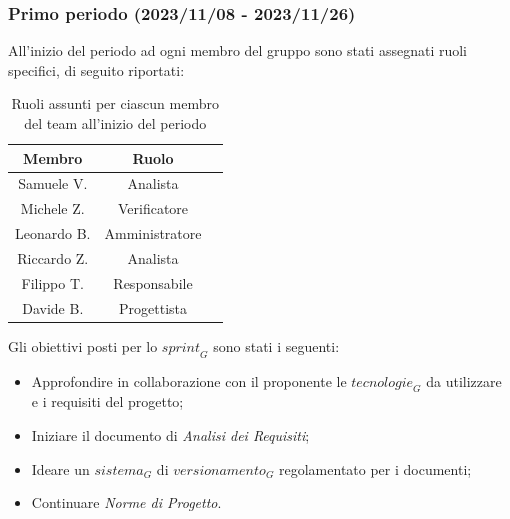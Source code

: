 \subsubsection{Primo periodo (2023/11/08 - 2023/11/26)}

All'inizio del periodo ad ogni membro del gruppo sono stati assegnati ruoli specifici, di seguito riportati:
\begin{table}[H]
\centering
\begin{tabular}{|c|c|c|}
\hline
\textbf{Membro} & \textbf{Ruolo} \\
\hline
Samuele V. & Analista \\
\hline
Michele Z. & Verificatore \\
\hline
Leonardo B. & Amministratore \\
\hline
Riccardo Z. & Analista \\
\hline
Filippo T. & Responsabile \\
\hline
Davide B. & Progettista \\
\hline
\end{tabular}
\caption{Ruoli assunti per ciascun membro del team all'inizio del periodo}
\end{table}
Gli obiettivi posti per lo $\textit{sprint}_G$ sono stati i seguenti:
\begin{itemize}
    \item Approfondire in collaborazione con il proponente le $\textit{tecnologie}_G$ da utilizzare e i requisiti del progetto;
    \item Iniziare il documento di \emph{Analisi dei Requisiti};
    \item Ideare un $\textit{sistema}_G$ di $\textit{versionamento}_G$ regolamentato per i documenti;
    \item Continuare \emph{Norme di Progetto}.
\end{itemize}

